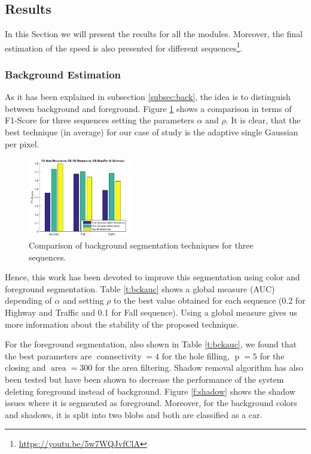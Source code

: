 \documentclass{article}
\begin{document}
\subsection{Results}

In this Section we will present the results for all the modules. Moreover, the final estimation of the speed is also presented for different sequences\footnote{\url{https://youtu.be/5w7WQJvfClA}}.

\subsubsection{Background Estimation}

As it has been explained in subsection \ref{subsec:back}, the idea is to distinguish between background and foreground. Figure \ref{f:compback} shows a comparison in terms of F1-Score for three sequences setting the parameters \(\alpha\) and \(\rho\). It is clear, that the best technique (in average) for our case of study is the adaptive single Gaussian per pixel.

\begin{figure}[!htb]
	\centering
	\includegraphics[width=0.4\textwidth]{fig/task1_comparisonMethods}
    \caption{Comparison of background segmentation techniques for three sequences.}
    \label{f:compback}
\end{figure}

Hence, this work has been devoted to improve this segmentation using color and foreground segmentation. Table \ref{t:bckauc} shows a global measure (AUC) depending of \(\alpha\) and setting \(\rho\) to the best value obtained for each sequence (0.2 for Highway and Traffic and 0.1 for Fall sequence). Using a global measure gives us more information about the stability of the proposed technique.

For the foreground segmentation, also shown in Table \ref{t:bckauc}, we found that the best parameters are \(\operatorname{connectivity}=4\) for the hole filling, \(\operatorname{p}=5\) for the closing and \(\operatorname{area}=300\) for the area filtering. Shadow removal algorithm has also been tested but have been shown to decrease the performance of the system deleting foreground instead of background. Figure \ref{f:shadow} shows the shadow issues where it is segmented as foreground. Moreover, for the background colors and shadows, it is split into two blobs and both are classified as a car. 
\end{document}
